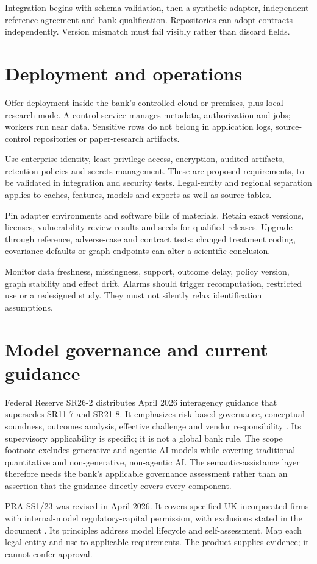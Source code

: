 Integration begins with schema validation, then a synthetic adapter,
independent reference agreement and bank qualification. Repositories can
adopt contracts independently. Version mismatch must fail visibly rather
than discard fields.

\section{Deployment and operations}
Offer deployment inside the bank's controlled cloud or premises, plus local
research mode. A control service manages metadata, authorization and jobs;
workers run near data. Sensitive rows do not belong in application logs,
source-control repositories or paper-research artifacts.

Use enterprise identity, least-privilege access, encryption, audited
artifacts, retention policies and secrets management. These are proposed
requirements, to be validated in integration and security tests.
Legal-entity and regional separation applies to caches, features, models
and exports as well as source tables.

Pin adapter environments and software bills of materials. Retain exact
versions, licenses, vulnerability-review results and seeds for qualified
releases. Upgrade through reference, adverse-case and contract tests:
changed treatment coding, covariance defaults or graph endpoints can
alter a scientific conclusion.

Monitor data freshness, missingness, support, outcome delay, policy version,
graph stability and effect drift. Alarms should trigger recomputation,
restricted use or a redesigned study. They must not silently relax
identification assumptions.

\section{Model governance and current guidance}
Federal Reserve SR26-2 distributes April 2026 interagency guidance that
supersedes SR11-7 and SR21-8. It emphasizes risk-based governance,
conceptual soundness, outcomes analysis, effective challenge and vendor
responsibility \citep{fed2026}. Its supervisory applicability is specific;
it is not a global bank rule.
The scope footnote excludes generative and agentic AI models while
covering traditional quantitative and non-generative, non-agentic AI.
The semantic-assistance layer therefore needs the bank's applicable
governance assessment rather than an assertion that the guidance directly
covers every component.

PRA SS1/23 was revised in April 2026. It covers specified UK-incorporated
firms with internal-model regulatory-capital permission, with exclusions
stated in the document \citep{pra2026}. Its principles address model
lifecycle and self-assessment. Map each legal entity and use to applicable
requirements. The product supplies evidence; it cannot confer approval.
